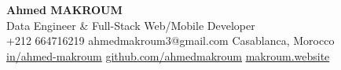 \documentclass[10pt,a4paper,sans]{moderncv}
\begin{document}
\begin{center}
    {\fontsize{20}{22}\selectfont\textbf{Ahmed MAKROUM}}\\[0.7em]
    {\fontsize{13.2}{15.4}\selectfont Data Engineer \& Full-Stack Web/Mobile Developer} \\[0.5em]
    {\fontsize{10.5}{12.3}\selectfont
      \faMobile\enspace +212 664716219 \quad
      \faEnvelope\enspace ahmedmakroum3@gmail.com \quad
      \faHome\enspace Casablanca, Morocco \\
      \faLinkedin\enspace \href{https://www.linkedin.com/in/ahmed-makroum/}{in/ahmed-makroum} \quad
      \faGithub\enspace \href{https://github.com/ahmedmakroum}{github.com/ahmedmakroum}
      \faGlobe\enspace \href{https://makroum.website}{makroum.website}
    }\\[1em]
\end{center}
\vspace{-14pt}


\end{document}
